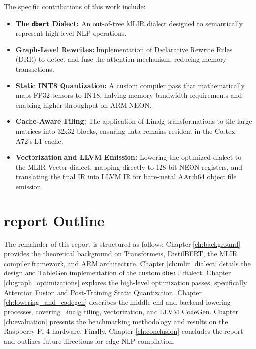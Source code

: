 The specific contributions of this work include:
\begin{itemize}
    \item \textbf{The \texttt{dbert} Dialect:} An out-of-tree MLIR dialect designed to semantically represent high-level NLP operations.
    \item \textbf{Graph-Level Rewrites:} Implementation of Declarative Rewrite Rules (DRR) to detect and fuse the attention mechanism, reducing memory transactions.
    \item \textbf{Static INT8 Quantization:} A custom compiler pass that mathematically maps FP32 tensors to INT8, halving memory bandwidth requirements and enabling higher throughput on ARM NEON.
    \item \textbf{Cache-Aware Tiling:} The application of Linalg transformations to tile large matrices into 32x32 blocks, ensuring data remains resident in the Cortex-A72's L1 cache.
    \item \textbf{Vectorization and LLVM Emission:} Lowering the optimized dialect to the MLIR Vector dialect, mapping directly to 128-bit NEON registers, and translating the final IR into LLVM IR for bare-metal AArch64 object file emission.
\end{itemize}

\section{report Outline}
The remainder of this report is structured as follows:
Chapter \ref{ch:background} provides the theoretical background on Transformers, DistilBERT, the MLIR compiler framework, and ARM architecture. 
Chapter \ref{ch:mlir_dialect} details the design and TableGen implementation of the custom \texttt{dbert} dialect. 
Chapter \ref{ch:graph_optimizations} explores the high-level optimization passes, specifically Attention Fusion and Post-Training Static Quantization. 
Chapter \ref{ch:lowering_and_codegen} describes the middle-end and backend lowering processes, covering Linalg tiling, vectorization, and LLVM CodeGen. 
Chapter \ref{ch:evaluation} presents the benchmarking methodology and results on the Raspberry Pi 4 hardware. 
Finally, Chapter \ref{ch:conclusion} concludes the report and outlines future directions for edge NLP compilation.


